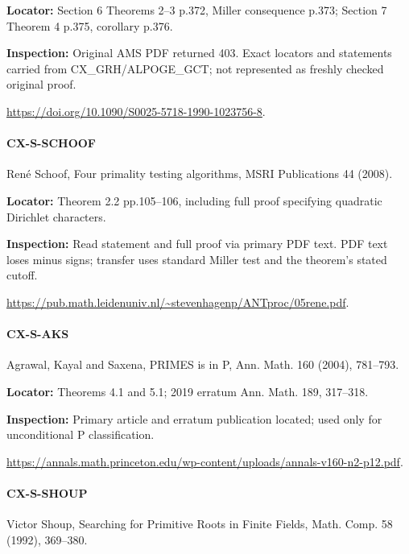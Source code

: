 \documentclass[11pt,a4paper]{article}
\begin{document}
\textbf{Locator:} Section 6 Theorems 2–\allowbreak{}3 p.\allowbreak{}372, Miller consequence p.\allowbreak{}373; Section 7 Theorem 4 p.\allowbreak{}375, corollary p.\allowbreak{}376.

\textbf{Inspection:} Original AMS PDF returned 403.\allowbreak{} Exact locators and statements carried from CX\_\allowbreak{}GRH/\allowbreak{}ALPOGE\_\allowbreak{}GCT; not represented as freshly checked original proof.\allowbreak{}

\url{https://doi.org/10.1090/S0025-5718-1990-1023756-8}.

\paragraph{CX-S-SCHOOF} René Schoof, Four primality testing algorithms, MSRI Publications 44 (2008).

\textbf{Locator:} Theorem 2.\allowbreak{}2 pp.\allowbreak{}105–\allowbreak{}106, including full proof specifying quadratic Dirichlet characters.

\textbf{Inspection:} Read statement and full proof via primary PDF text.\allowbreak{} PDF text loses minus signs; transfer uses standard Miller test and the theorem’s stated cutoff.\allowbreak{}

\url{https://pub.math.leidenuniv.nl/~stevenhagenp/ANTproc/05rene.pdf}.

\paragraph{CX-S-AKS} Agrawal, Kayal and Saxena, PRIMES is in P, Ann.\allowbreak{} Math.\allowbreak{} 160 (2004), 781–\allowbreak{}793.

\textbf{Locator:} Theorems 4.\allowbreak{}1 and 5.\allowbreak{}1; 2019 erratum Ann.\allowbreak{} Math.\allowbreak{} 189, 317–\allowbreak{}318.

\textbf{Inspection:} Primary article and erratum publication located; used only for unconditional P classification.\allowbreak{}

\url{https://annals.math.princeton.edu/wp-content/uploads/annals-v160-n2-p12.pdf}.

\paragraph{CX-S-SHOUP} Victor Shoup, Searching for Primitive Roots in Finite Fields, Math.\allowbreak{} Comp.\allowbreak{} 58 (1992), 369–\allowbreak{}380.
\end{document}
